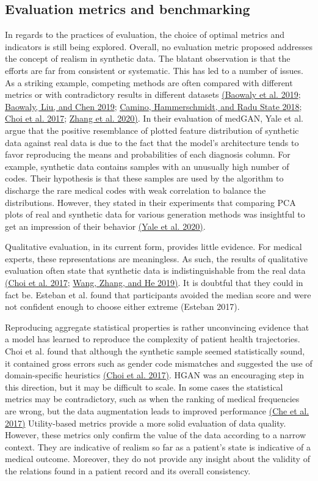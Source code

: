 \documentclass[10pt]{article}
\begin{document}
\subsection{Evaluation metrics and benchmarking}
In regards to the practices of evaluation, the choice of optimal metrics and indicators is still being explored. Overall, no evaluation metric proposed addresses the concept of realism in synthetic data. The blatant observation is that the efforts are far from consistent or systematic. This has led to a number of issues. As a striking example, competing methods are often compared with different metrics or with contradictory results in different datasets \hyperref[csl:29]{(Baowaly et al. 2019}; \hyperref[csl:28]{Baowaly, Liu, and Chen 2019}; \hyperref[csl:22]{Camino, Hammerschmidt, and {Radu State} 2018}; \hyperref[csl:31]{Choi et al. 2017}; \hyperref[csl:32]{Zhang et al. 2020)}. In their evaluation of medGAN, Yale et al. argue that the positive resemblance of plotted feature distribution of synthetic data against real data is due to the fact that the model's architecture tends to favor reproducing the means and probabilities of each diagnosis column. For example, synthetic data contains samples with an unusually high number of codes. Their hypothesis is that these samples are used by the algorithm to discharge the rare medical codes with weak correlation to balance the distributions. However, they stated in their experiments that comparing PCA plots of real and synthetic data for various generation methods was insightful to get an impression of their behavior \hyperref[csl:19]{(Yale et al. 2020)}.\par
Qualitative evaluation, in its current form, provides little evidence. For medical experts, these representations are meaningless. As such, the results of qualitative evaluation often state that synthetic data is indistinguishable from the real data \hyperref[csl:47]{(Choi et al. 2017}; \hyperref[csl:9]{Wang, Zhang, and He 2019)}. It is doubtful that they could in fact be. Esteban et al. found that participants avoided the median score and were not confident enough to choose either extreme (Esteban 2017).\par
Reproducing aggregate statistical properties is rather unconvincing evidence that a model has learned to reproduce the complexity of patient health trajectories. Choi et al. found that although the synthetic sample seemed statistically sound, it contained gross errors such as gender code mismatches and suggested the use of domain-specific heuristics \hyperref[csl:47]{(Choi et al. 2017)}. HGAN was an encouraging step in this direction, but it may be difficult to scale. In some cases the statistical metrics may be contradictory, such as when the ranking of medical frequencies are wrong, but the data augmentation leads to improved performance \hyperref[csl:15]{(Che et al. 2017)}
Utility-based metrics provide a more solid evaluation of data quality. However, these metrics only confirm the value of the data according to a narrow context. They are indicative of realism so far as a patient's state is indicative of a medical outcome. Moreover, they do not provide any insight about the validity of the relations found in a patient record and its overall consistency. 
\end{document}

